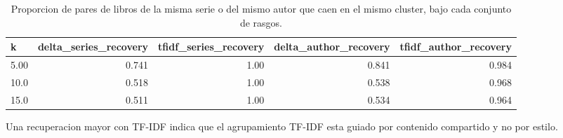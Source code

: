 \begin{table}[htbp]
\centering
\small
\caption{Proporcion de pares de libros de la misma serie o del mismo autor que caen en el mismo cluster, bajo cada conjunto de rasgos.}
\label{tab:method-comparison-es}
\begin{tabular}{lrrrr}
\toprule
\textbf{k} & \textbf{delta\_series\_recovery} & \textbf{tfidf\_series\_recovery} & \textbf{delta\_author\_recovery} & \textbf{tfidf\_author\_recovery} \\
\midrule
5.00 & 0.741 & 1.00 & 0.841 & 0.984 \\
10.0 & 0.518 & 1.00 & 0.538 & 0.968 \\
15.0 & 0.511 & 1.00 & 0.534 & 0.964 \\
\bottomrule
\end{tabular}
\vspace{0.5em}
\begin{minipage}{\linewidth}\footnotesize Una recuperacion mayor con TF-IDF indica que el agrupamiento TF-IDF esta guiado por contenido compartido y no por estilo.\end{minipage}
\end{table}

